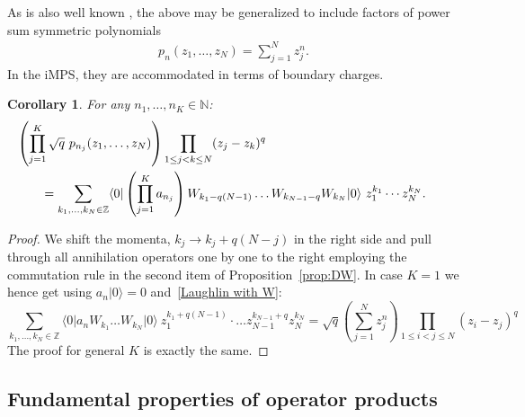 \documentclass[letterpaper, DIV=17]{scrartcl}
\newtheorem{cor}[theorem]{Corollary}
\numberwithin{equation}{section}
\theoremstyle{definition}
\begin{document}
As is also well known \cite[Section 2.2]{estienne2013fractional}, the above may be generalized to include factors of power sum symmetric polynomials 
		\begin{align*}
			p_n(z_1, \dots, z_N) = \sum_{j=1}^N z_j^n.
		\end{align*}
In the iMPS, they are accommodated in terms of boundary charges. 
%
				\begin{cor} \label{prop:MPS power symmetric}
			For any $n_1, \dots, n_K \in \mathbb{N}$:				
			\begin{align}\label{eq:MPS power symmetric}
					& \left( \prod_{j=1}^K \sqrt{q} \ p_{n_j}(z_1, \dots, z_N) \right) \prod_{1\leq j<k\leq N} (z_j-z_k)^q  \notag \\
					 & \qquad =  \sum_{k_1, \dots, k_N\in \mathbb{Z}} \langle 0 \vert \left(\prod_{j=1}^K a_{n_j} \right) W_{k_1-q(N-1)} \dots W_{k_{N-1}-q} W_{k_N}\vert 0 \rangle \  z_1^{k_1}\cdots z_N^{k_N} .	\qquad 
					 \end{align}
		\end{cor}
		\begin{proof}
		We shift the momenta, $ k_j \to k_j + q(N-j) $ in the right side and pull through all annihilation operators one by one to the right employing the commutation rule in the second item of Proposition~\eqref{prop:DW}.  In case $ K = 1 $ we hence get using $a_n \vert 0\rangle =0$ and~\eqref{Laughlin with W}:
			$$
				 \sum_{k_1, \dots, k_N\in \mathbb{Z}}\!\! \langle 0 \vert a_n W_{k_1} \dots W_{k_N} \vert 0 \rangle \ z_1^{k_1+q(N-1)}\cdot \dots z_{N-1}^{k_{N-1} +q} z_N^{k_N} 
				= \sqrt{q} \left(\sum_{j=1}^N z_j^n\right)\!\! \prod_{1\leq i < j \leq N} (z_i-z_j)^q 
			$$
			The proof for general $K$ is exactly the same.
			\end{proof}


\subsection{Fundamental properties of operator products}
\end{document}
